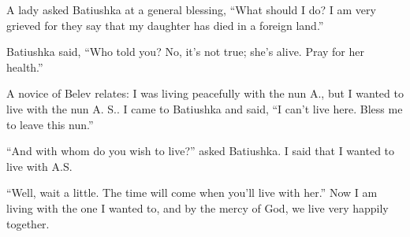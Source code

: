 A lady asked Batiushka at a general blessing, ``What should I do? I am very grieved for they say that my daughter has died in a foreign land.''

Batiushka said, ``Who told you? No, it's not true; she's alive. Pray for her health.''


\begin{longquote}{A novice of Belev relates:}
I was living peacefully with the nun A., but I wanted to live with the nun A. S.. I came to Batiushka and said, ``I can't live here. Bless me to leave this nun.''

``And with whom do you wish to live?'' asked Batiushka. I said that I wanted to live with A.S.

``Well, wait a little. The time will come when you'll live with her.'' Now I am living with the one I wanted to, and by the mercy of God, we live very happily together.
\end{longquote}

